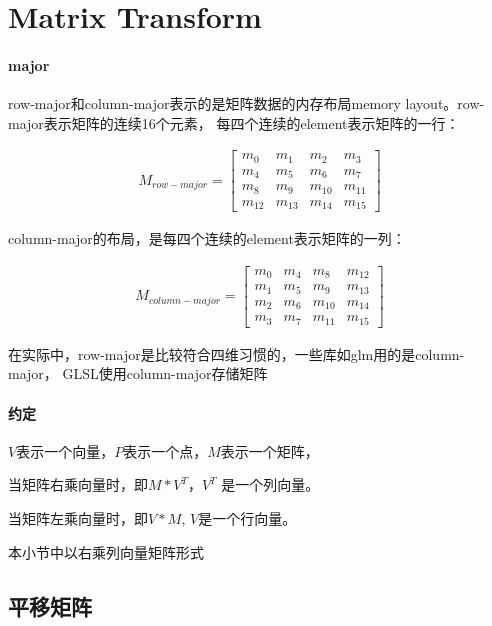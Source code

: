 \section{Matrix Transform}

\paragraph{major}
row-major和column-major表示的是矩阵数据的内存布局memory layout。row-major表示矩阵的连续16个元素，
每四个连续的element表示矩阵的一行：

\begin{gather*}
    M_{row-major} = 
    \begin{bmatrix}
        m_{0} & m_{1} & m_{2} & m_{3} \\ 
        m_{4} & m_{5} & m_{6} & m_{7} \\
        m_{8} & m_{9} & m_{10} & m_{11} \\
        m_{12} & m_{13} & m_{14} & m_{15}
    \end{bmatrix}
\end{gather*}

column-major的布局，是每四个连续的element表示矩阵的一列：

\begin{gather*}
    M_{column-major} = 
    \begin{bmatrix}
        m_{0} & m_{4} & m_{8} & m_{12} \\ 
        m_{1} & m_{5} & m_{9} & m_{13} \\
        m_{2} & m_{6} & m_{10} & m_{14} \\
        m_{3} & m_{7} & m_{11} & m_{15}
    \end{bmatrix}
\end{gather*}

在实际中，row-major是比较符合四维习惯的，一些库如glm用的是column-major，
GLSL使用column-major存储矩阵

\paragraph{约定}
\par
$V$表示一个向量，$P$表示一个点，$M$表示一个矩阵，
\par
当矩阵右乘向量时，即$M \ast V^T$，$V^T$ 是一个列向量。
\par
当矩阵左乘向量时，即$V \ast M$, $V$是一个行向量。
\par
本小节中以右乘列向量矩阵形式

\subsection{平移矩阵}

